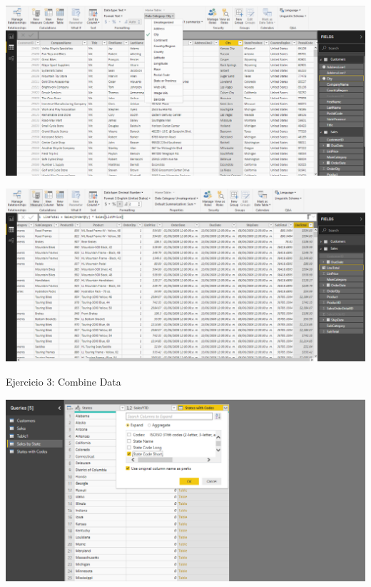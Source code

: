 	\begin{center}
	\includegraphics[width=15cm]{./Imagenes/EJER1T2(5)}
	\end{center}	


	

	\begin{center}
	\includegraphics[width=15cm]{./Imagenes/EJER1T2(8)}
	\end{center}	
\newpage
Ejercicio 3: Combine Data\\
	\begin{center}
	\includegraphics[width=15cm]{./Imagenes/EJER1T3(1)}
	\end{center}	

